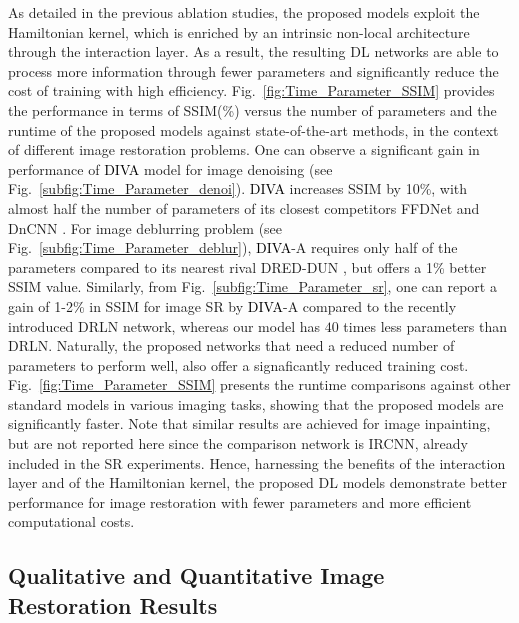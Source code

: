 \documentclass[10pt,journal,compsoc]{IEEEtran}
\newcommand{\dk}{\textcolor{black}}
\begin{document}
As detailed in the previous ablation studies, the proposed models exploit the Hamiltonian kernel, which is enriched by an intrinsic non-local architecture through the interaction layer. As a result, the resulting DL networks are able to process more information through fewer parameters and significantly reduce the cost of training with high efficiency. Fig.~\ref{fig:Time_Parameter_SSIM} provides the performance in terms of SSIM(\%) versus the number of parameters and the runtime of the proposed models against state-of-the-art methods, in the context of different image restoration problems. One can observe a significant gain in performance of \dk{DIVA} model for image denoising (see Fig.~\ref{subfig:Time_Parameter_denoi}). \dk{DIVA} increases SSIM by 10\%, with almost half the number of parameters of its closest competitors FFDNet \cite{Zhang2018FFDNet} and DnCNN \cite{Zhang2017beyond}. For image deblurring problem (see Fig.~\ref{subfig:Time_Parameter_deblur}), \dk{DIVA}-A requires only half of the parameters compared to its nearest rival DRED-DUN \cite{Kong2022deep}, but offers a 1\% better SSIM value. Similarly, from Fig.~\ref{subfig:Time_Parameter_sr}, one can report a gain of 1-2\% in SSIM for image SR by \dk{DIVA}-A compared to the recently introduced DRLN network, whereas our model has $40$ times less parameters than DRLN. Naturally, the proposed networks that need a reduced number of parameters to perform well, also offer a signaficantly reduced training cost. Fig.~\ref{fig:Time_Parameter_SSIM} presents the runtime comparisons against other standard models in various imaging tasks, showing that the proposed models are significantly faster. Note that similar results are achieved for image inpainting, but are not reported here since the comparison network is IRCNN, already included in the SR experiments.
Hence, harnessing the benefits of the interaction layer and of the Hamiltonian kernel, the proposed DL models demonstrate better performance for image restoration with fewer parameters and more efficient computational costs.




\subsection{Qualitative and Quantitative Image Restoration Results}
\label{sec:results}
\end{document}
